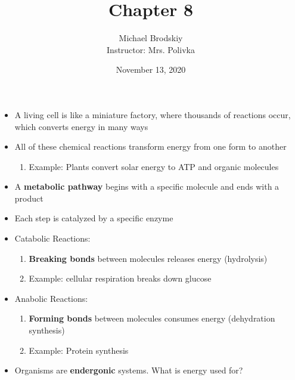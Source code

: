 \documentclass[12pt]{article}
\title{Chapter 8}
\date{November 13, 2020}
\author{Michael Brodskiy\\ \small Instructor: Mrs. Polivka}
\begin{document}
\maketitle

\begin{itemize}

  \item A living cell is like a miniature factory, where thousands of reactions occur, which converts energy in many ways

  \item All of these chemical reactions transform energy from one form to another

    \begin{enumerate}

      \item Example: Plants convert solar energy to ATP and organic molecules

    \end{enumerate}

  \item A \textbf{metabolic pathway} begins with a specific molecule and ends with a product

  \item Each step is catalyzed by a specific enzyme

  \item Catabolic Reactions:

    \begin{enumerate}

      \item \textbf{Breaking bonds} between molecules releases energy (hydrolysis)

      \item Example: cellular respiration breaks down glucose

    \end{enumerate}

  \item Anabolic Reactions:

    \begin{enumerate}

      \item \textbf{Forming bonds} between molecules consumes energy (dehydration synthesis)

      \item Example: Protein synthesis

    \end{enumerate}

  \item Organisms are \textbf{endergonic} systems. What is energy used for?


\end{itemize}
\end{document}
